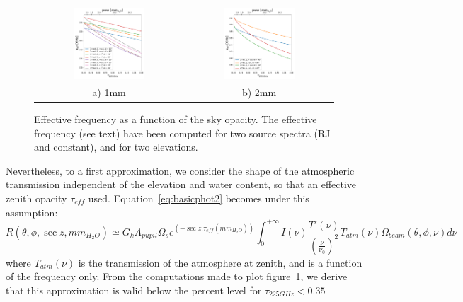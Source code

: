\begin{figure}[h]
\begin{tabular}{cc}
\includegraphics[width=0.5\textwidth]{Figures/atm_nueff_1mm.pdf}
  & \includegraphics[width=0.5\textwidth]{Figures/atm_nueff_2mm.pdf}
  \\
a) 1mm & b) 2mm \\
\end{tabular}
\caption{Effective frequency as a function of the sky opacity. The
  effective frequency (see text) have been computed for two source
  spectra (RJ and constant), and for two elevations.}
\label{fig:nueff}
\end{figure}

Nevertheless, to a first approximation, we consider the shape of the atmospheric
transmission independent of the elevation and water content, so that  an
effective zenith opacity $\tau_{eff}$
used. 
Equation~\ref{eq:basicphot2} becomes under this assumption: 
\begin{equation}
R(\theta, \phi, \sec z, mm_{H_{2}O}) \simeq G_{k}  A_{pupil}\Omega_{s} e^{\left(-\sec z
  . \tau_{eff}(mm_{H_{2}O})\right)} \int_{0}^{+\infty} I(\nu)
\frac{T'(\nu)}{\left(\frac{\nu}{\nu_{0}}\right)^{2}} T_{atm}(\nu)
\Omega_{beam} (\theta, \phi, \nu) d\nu 
\label{eq:basicphot3}
\end{equation}
where $T_{atm}(\nu)$ is the transmission of the atmosphere at zenith,
and is a function of the frequency only. From the computations made to
plot figure~\ref{fig:nueff}, we derive that this approximation 
is valid below the percent level for $\tau_{225GHz} < 0.35$

